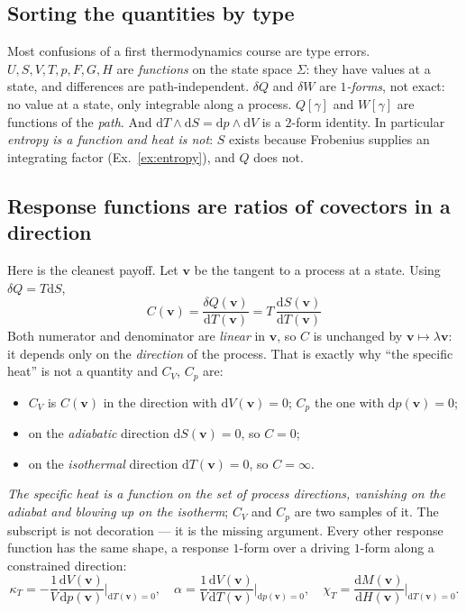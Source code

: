 \documentclass[10pt,a4paper]{article}
\newcommand{\dd}{\mathrm{d}}
\newcommand{\vv}{\mathbf{v}}
\theoremstyle{plain}
\theoremstyle{definition}
\numberwithin{equation}{section}
\begin{document}
\subsection{Sorting the quantities by type}

Most confusions of a first thermodynamics course are type errors. $U,S,V,T,p,F,G,H$ are
\emph{functions} on the state space $\Sigma$: they have values at a state, and differences are
path-independent. $\delta Q$ and $\delta W$ are \emph{$1$-forms}, not exact: no value at a
state, only integrable along a process. $Q[\gamma]$ and $W[\gamma]$ are functions of the
\emph{path}. And $\dd T\wedge\dd S=\dd p\wedge\dd V$ is a $2$-form identity. In particular
\emph{entropy is a function and heat is not}: $S$ exists because Frobenius supplies an
integrating factor (Ex.~\ref{ex:entropy}), and $Q$ does not.

\subsection{Response functions are ratios of covectors in a direction}
\label{sec:response}

Here is the cleanest payoff. Let $\vv$ be the tangent to a process at a state. Using
$\delta Q=T\dd S$,
\begin{equation}
\boxed{\ C(\vv)=\frac{\delta Q(\vv)}{\dd T(\vv)}=T\,\frac{\dd S(\vv)}{\dd T(\vv)}\ }
\label{eq:specheat}
\end{equation}
Both numerator and denominator are \emph{linear} in $\vv$, so $C$ is unchanged by
$\vv\mapsto\lambda\vv$: it depends only on the \emph{direction} of the process. That is exactly
why ``the specific heat'' is not a quantity and $C_V$, $C_p$ are:
\begin{itemize}[leftmargin=1.3em,itemsep=1pt]
\item $C_V$ is $C(\vv)$ in the direction with $\dd V(\vv)=0$; $C_p$ the one with $\dd p(\vv)=0$;
\item on the \emph{adiabatic} direction $\dd S(\vv)=0$, so $C=0$;
\item on the \emph{isothermal} direction $\dd T(\vv)=0$, so $C=\infty$.
\end{itemize}
\emph{The specific heat is a function on the set of process directions, vanishing on the adiabat
and blowing up on the isotherm}; $C_V$ and $C_p$ are two samples of it. The subscript is not
decoration --- it is the missing argument. Every other response function has the same shape,
a response $1$-form over a driving $1$-form along a constrained direction:
\begin{equation}
\kappa_T=-\frac1V\frac{\dd V(\vv)}{\dd p(\vv)}\bigg|_{\dd T(\vv)=0},\quad
\alpha=\frac1V\frac{\dd V(\vv)}{\dd T(\vv)}\bigg|_{\dd p(\vv)=0},\quad
\chi_T=\frac{\dd M(\vv)}{\dd H(\vv)}\bigg|_{\dd T(\vv)=0}.
\end{equation}
\end{document}

